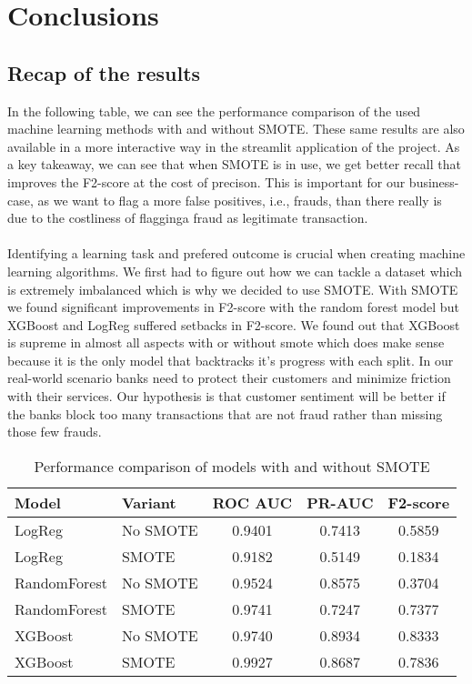 \documentclass{article}
\begin{document}
\section{Conclusions}

\subsection{Recap of the results}

In the following table, we can see the performance comparison of the used machine learning methods with and without SMOTE. These same results are also available in a more interactive way in the streamlit application of the project. As a key takeaway, we can see that when SMOTE is in use, we get better recall that improves the F2-score at the cost of precison. This is important for our business-case, as we want to flag a more false positives, i.e., frauds, than there really is due to the costliness of flagginga fraud as legitimate transaction.\\
\\
Identifying a learning task and prefered outcome is crucial when creating machine learning algorithms. We first had to figure out how we can tackle a dataset which is extremely imbalanced which is why we decided to use SMOTE. With SMOTE we found significant improvements in F2-score with the random forest model but XGBoost and LogReg suffered setbacks in F2-score. We found out that XGBoost is supreme in almost all aspects with or without smote which does make sense because it is the only model that backtracks it's progress with each split. In our real-world scenario banks need to protect their customers and minimize friction with their services. Our hypothesis is that customer sentiment will be better if the banks block too many transactions that are not fraud rather than missing those few frauds. 

\begin{table}[h]
\centering
\begin{tabular}{llccc}
\toprule
Model & Variant & ROC AUC & PR-AUC & F2-score \\
\midrule
LogReg        & No SMOTE & 0.9401 & 0.7413 & 0.5859 \\
LogReg        & SMOTE    & 0.9182 & 0.5149 & 0.1834 \\
RandomForest  & No SMOTE & 0.9524 & 0.8575 & 0.3704 \\
RandomForest  & SMOTE    & 0.9741 & 0.7247 & 0.7377 \\
XGBoost       & No SMOTE & 0.9740 & 0.8934 & 0.8333 \\
XGBoost       & SMOTE    & 0.9927 & 0.8687 & 0.7836 \\
\bottomrule
\end{tabular}

\caption{Performance comparison of models with and without SMOTE}
\label{tab:model_performance}
\end{table}
\end{document}
